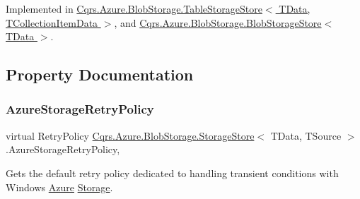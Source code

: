 Implemented in \hyperlink{classCqrs_1_1Azure_1_1BlobStorage_1_1TableStorageStore_a869eba77358b10fc298f8e13fb21d628_a869eba77358b10fc298f8e13fb21d628}{Cqrs.\+Azure.\+Blob\+Storage.\+Table\+Storage\+Store$<$ T\+Data, T\+Collection\+Item\+Data $>$}, and \hyperlink{classCqrs_1_1Azure_1_1BlobStorage_1_1BlobStorageStore_a03be976aded454866b4589de99a9e1c8_a03be976aded454866b4589de99a9e1c8}{Cqrs.\+Azure.\+Blob\+Storage.\+Blob\+Storage\+Store$<$ T\+Data $>$}.



\subsection{Property Documentation}
\mbox{\label{classCqrs_1_1Azure_1_1BlobStorage_1_1StorageStore_ad16f8d276c7570c95979b39098d1216b_ad16f8d276c7570c95979b39098d1216b}} 
\subsubsection{\texorpdfstring{Azure\+Storage\+Retry\+Policy}{AzureStorageRetryPolicy}}
{\footnotesize\ttfamily virtual Retry\+Policy \hyperlink{classCqrs_1_1Azure_1_1BlobStorage_1_1StorageStore}{Cqrs.\+Azure.\+Blob\+Storage.\+Storage\+Store}$<$ T\+Data, T\+Source $>$.Azure\+Storage\+Retry\+Policy\hspace{0.3cm}{\ttfamily [get]}, {\ttfamily [protected]}}



Gets the default retry policy dedicated to handling transient conditions with Windows \hyperlink{namespaceCqrs_1_1Azure}{Azure} \hyperlink{namespaceCqrs_1_1Azure_1_1Storage}{Storage}. 

\mbox{\label{classCqrs_1_1Azure_1_1BlobStorage_1_1StorageStore_ac5c27123fd0bf4d926a4865e2d6b0bdd_ac5c27123fd0bf4d926a4865e2d6b0bdd}} 

